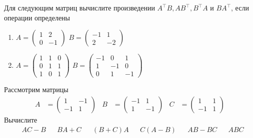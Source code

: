 \begin{exercise}
Для следующим матриц вычислите произведении \(A^\top B, AB^\top, B^\top A\) и \(BA^\top\), если операции определены
\begin{enumerate}
	\item \(A=\begin{pmatrix} 1 & 2 \\ 0 & -1 \end{pmatrix}\) 
	\(B=\begin{pmatrix} -1 & 1 \\ 2 & -2 \end{pmatrix}\)
	\item \(A=\begin{pmatrix} 1 & 1 & 0 \\ 0 & 1 & 1 \\ 1 & 0 & 1 \end{pmatrix}\) 
	\(B=\begin{pmatrix} -1 & 0 & 1 \\ 1 & -1 & 0 \\ 0 & 1 & -1 \end{pmatrix}\)
\end{enumerate}
\end{exercise}

\begin{exercise}
Рассмотрим матрицы
\begin{align*}
	A&=\begin{pmatrix}
		1 & -1 \\ -1 & 1 
	\end{pmatrix} &
	B&=\begin{pmatrix}
		-1 & 1 \\ 1 & -1 
	\end{pmatrix} &
		C&=\begin{pmatrix}
		1 & 1 \\ -1 & 1
	\end{pmatrix}
\end{align*}
Вычислите
\begin{align*}
	& AC-B & &BA+C & &(B+C)A & &C(A-B) & &AB-BC & &ABC
\end{align*}
\end{exercise}

